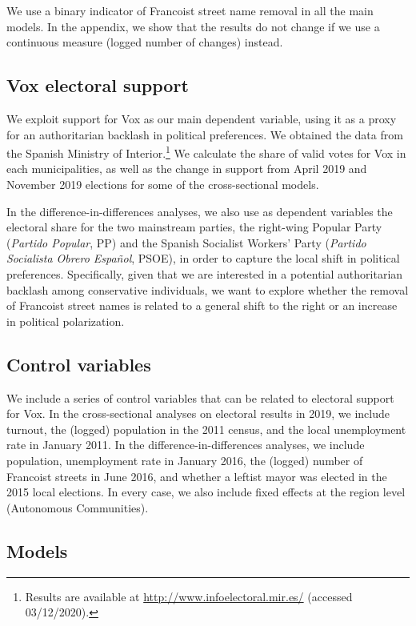 \documentclass[12pt, notitlepage]{article}
\begin{document}
We use a binary indicator of Francoist street name removal in all the main models.
In the appendix, we show that the results do not change if we use a continuous measure (logged number of changes) instead.

\subsection*{Vox electoral support}

We exploit support for Vox as our main dependent variable, using it as a proxy for an authoritarian backlash in political preferences.
We obtained the data from the Spanish Ministry of Interior.\footnote{Results are available at \href{http://www.infoelectoral.mir.es/}{http://www.infoelectoral.mir.es/} (accessed 03/12/2020).}
We calculate the share of valid votes for Vox in each municipalities, as well as the change in support from April 2019 and November 2019 elections for some of the cross-sectional models.

In the difference-in-differences analyses, we also use as dependent variables the electoral share for the two mainstream parties, the right-wing Popular Party (\textit{Partido Popular}, PP) and the Spanish Socialist Workers' Party (\textit{Partido Socialista Obrero Español}, PSOE), in order to capture the local shift in political preferences.
Specifically, given that we are interested in a potential authoritarian backlash among conservative individuals, we want to explore whether the removal of Francoist street names is related to a general shift to the right or an increase in political polarization.

\subsection*{Control variables}

We include a series of control variables that can be related to electoral support for Vox.
In the cross-sectional analyses on electoral results in 2019, we include turnout, the (logged) population in the 2011 census, and the local unemployment rate in January 2011.
In the difference-in-differences analyses, we include population, unemployment rate in January 2016, the (logged) number of Francoist streets in June 2016, and whether a leftist mayor was elected in the 2015 local elections.
In every case, we also include fixed effects at the region level (Autonomous Communities).

\subsection*{Models}
\end{document}

